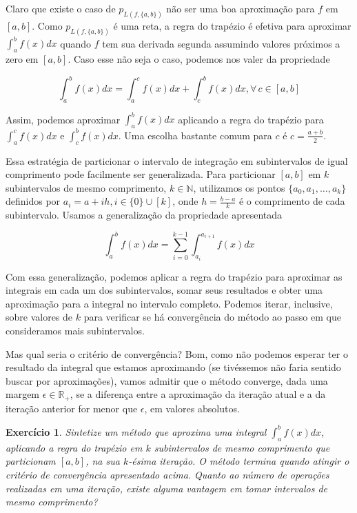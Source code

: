\documentclass[]{article}
\newtheorem{exercicio}{Exercício}
\numberwithin{equation}{section}
\begin{document}
Claro que existe o caso de $p_{L(f, \{a, b\})}$ não ser uma boa
aproximação para $f$ em $[a, b]$. Como $p_{L(f, \{a, b\})}$ é uma
reta, a regra do trapézio é efetiva para aproximar
$\int_{a}^{b} f(x) dx$ quando $f$ tem sua derivada segunda assumindo
valores próximos a zero em $[a, b]$. Caso esse não seja o caso,
podemos nos valer da propriedade

$$
\int_{a}^{b} f(x) dx = \int_{a}^{c} f(x) dx + \int_{c}^{b} f(x) dx, \forall\, c \in [a, b]
$$

Assim, podemos aproximar $\int_{a}^{b} f(x) dx$ aplicando a regra do
trapézio para $\int_{a}^{c} f(x) dx$ e $\int_{c}^{b} f(x) dx$. Uma
escolha bastante comum para $c$ é $c = \frac{a + b}{2}$.

Essa estratégia de particionar o intervalo de integração em
subintervalos de igual comprimento pode facilmente ser
generalizada. Para particionar $[a, b]$ em $k$ subintervalos de mesmo
comprimento, $k \in \mathbb{N}$, utilizamos os pontos
$\{a_0, a_1, \dots, a_k\}$ definidos por
$a_i = a + ih, i \in \{0\} \cup [k]$, onde $h = \frac{b - a}{k}$ é o
comprimento de cada subintervalo. Usamos a generalização da
propriedade apresentada

$$
\int_{a}^{b} f(x) dx = \sum_{i = 0}^{k - 1} \int_{a_i}^{a_{i + 1}} f(x) dx
$$

Com essa generalização, podemos aplicar a regra do trapézio para
aproximar as integrais em cada um dos subintervalos, somar seus
resultados e obter uma aproximação para a integral no intervalo
completo. Podemos iterar, inclusive, sobre valores de $k$ para
verificar se há convergência do método ao passo em que consideramos
mais subintervalos.

Mas qual seria o critério de convergência? Bom, como não podemos
esperar ter o resultado da integral que estamos aproximando (se
tivéssemos não faria sentido buscar por aproximações), vamos admitir
que o método converge, dada uma margem $\epsilon \in \mathbb{R}_+$, se
a diferença entre a aproximação da iteração atual e a da iteração
anterior for menor que $\epsilon$, em valores absolutos.

\begin{exercicio} \label{exercicioRegraTrapezioImplementacao}
  Sintetize um método que aproxima uma integral
  $\int_{a}^{b} f(x) dx$, aplicando a regra do trapézio em $k$
  subintervalos de mesmo comprimento que particionam $[a, b]$, na sua
  $k$-ésima iteração. O método termina quando atingir o critério de
  convergência apresentado acima. Quanto ao número de operações
  realizadas em uma iteração, existe alguma vantagem em tomar
  intervalos de mesmo comprimento?
\end{exercicio}
\end{document}
